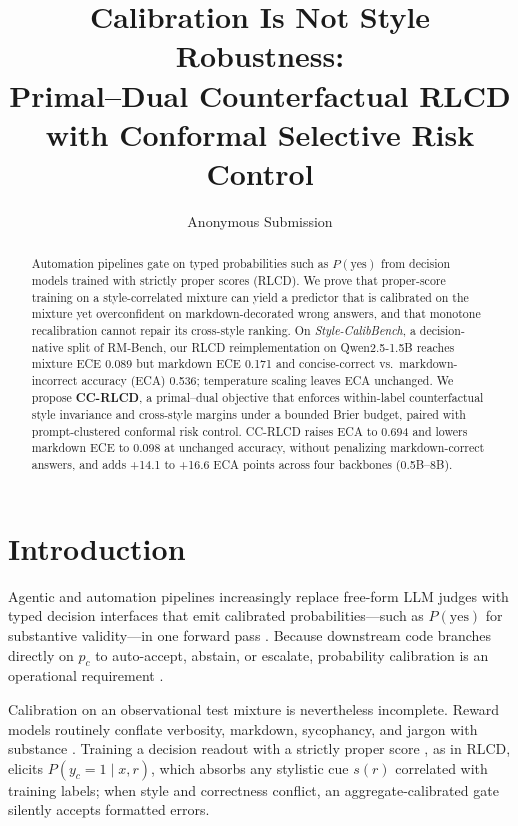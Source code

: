 \documentclass[letterpaper]{article} %
\title{Calibration Is Not Style Robustness:\\Primal--Dual Counterfactual RLCD with Conformal Selective Risk Control}
\author{Anonymous Submission}
\begin{document}
\maketitle

\begin{abstract}
Automation pipelines gate on typed probabilities such as $P(\mathrm{yes})$ from decision models trained with strictly proper scores (RLCD). We prove that proper-score training on a style-correlated mixture can yield a predictor that is calibrated on the mixture yet overconfident on markdown-decorated wrong answers, and that monotone recalibration cannot repair its cross-style ranking. On \emph{Style-CalibBench}, a decision-native split of RM-Bench, our RLCD reimplementation on Qwen2.5-1.5B reaches mixture ECE 0.089 but markdown ECE 0.171 and concise-correct vs.\ markdown-incorrect accuracy (ECA) 0.536; temperature scaling leaves ECA unchanged. We propose \textbf{CC-RLCD}, a primal--dual objective that enforces within-label counterfactual style invariance and cross-style margins under a bounded Brier budget, paired with prompt-clustered conformal risk control. CC-RLCD raises ECA to 0.694 and lowers markdown ECE to 0.098 at unchanged accuracy, without penalizing markdown-correct answers, and adds +14.1 to +16.6 ECA points across four backbones (0.5B--8B).
\end{abstract}

\section{Introduction}

Agentic and automation pipelines increasingly replace free-form LLM judges with typed decision interfaces that emit calibrated probabilities---such as $P(\mathrm{yes})$ for substantive validity---in one forward pass \citep{typesafe2026jev,justaskjev2026,openjev2026prdo}. Because downstream code branches directly on $p_c$ to auto-accept, abstain, or escalate, probability calibration is an operational requirement \citep{guo2017calibration,epstein2026fermieval}.

Calibration on an observational test mixture is nevertheless incomplete. Reward models routinely conflate verbosity, markdown, sycophancy, and jargon with substance \citep{liu2025rmbench,bharadwaj2026flattery,kim2026causal}. Training a decision readout with a strictly proper score \citep{brier1950verification,gneiting2007scoring}, as in RLCD, elicits $P(y_c{=}1\mid x,r)$, which absorbs any stylistic cue $s(r)$ correlated with training labels; when style and correctness conflict, an aggregate-calibrated gate silently accepts formatted errors.
\end{document}
